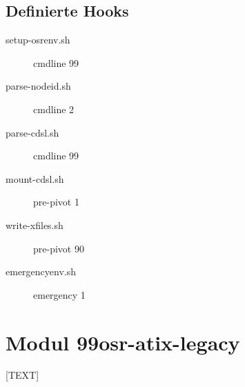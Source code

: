 \documentclass[10pt,a4paper,titlepage]{article}
\begin{document}
\subsection{Definierte Hooks}


\begin{description}
\item[setup-osrenv.sh] cmdline  99
\item[parse-nodeid.sh] cmdline  2
\item[parse-cdsl.sh] cmdline 99
\item[mount-cdsl.sh] pre-pivot 1
\item[write-xfiles.sh] pre-pivot 90
\item[emergencyenv.sh] emergency 1
\end{description}




\section{Modul 99osr-atix-legacy}

[TEXT]
\end{document}
